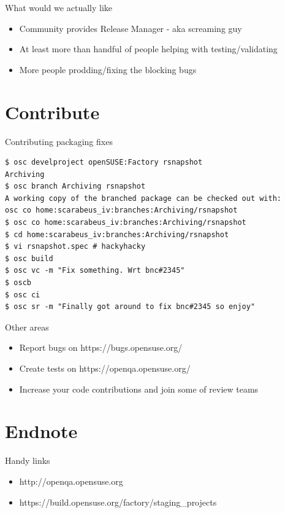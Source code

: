 \documentclass{beamer}
\begin{document}
\begin{frame}[t]{What would we actually like}
	\begin{itemize}
	\item Community provides Release Manager - aka screaming guy
	\item At least more than handful of people helping with testing/validating
	\item More people prodding/fixing the blocking bugs
	\end{itemize}
\end{frame}

\section{Contribute}

\begin{frame}[fragile]{Contributing packaging fixes}
        \begin{tiny}
        \begin{verbatim}
$ osc develproject openSUSE:Factory rsnapshot
Archiving
$ osc branch Archiving rsnapshot
A working copy of the branched package can be checked out with:
osc co home:scarabeus_iv:branches:Archiving/rsnapshot
$ osc co home:scarabeus_iv:branches:Archiving/rsnapshot
$ cd home:scarabeus_iv:branches:Archiving/rsnapshot
$ vi rsnapshot.spec # hackyhacky
$ osc build
$ osc vc -m "Fix something. Wrt bnc#2345"
$ oscb
$ osc ci
$ osc sr -m "Finally got around to fix bnc#2345 so enjoy"
        \end{verbatim}
        \end{tiny}
\end{frame}

\begin{frame}[t]{Other areas}
	\begin{itemize}
	\item Report bugs on https://bugs.opensuse.org/
	\item Create tests on https://openqa.opensuse.org/
	\item Increase your code contributions and join some of review teams
	\end{itemize}
\end{frame}

\section{Endnote}

\begin{frame}{Handy links}
	\begin{itemize}
	\item http://openqa.opensuse.org
	\item https://build.opensuse.org/factory/staging\_projects
	\end{itemize}
\end{frame}
\end{document}
